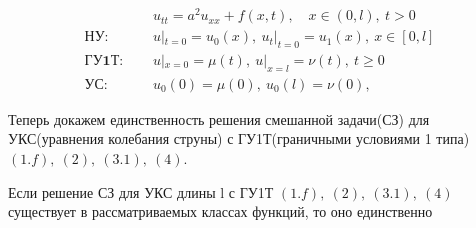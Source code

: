 \begin{align*}
	                      & u_{tt} = a^2 u_{xx} + f(x, t), \quad x \in (0,l),\ t > 0 \tag{1.f} \\
	\textbf{НУ: } \quad   & u|_{t=0}=u_0(x),\ u_t|_{t=0}=u_1(x),\ x \in [0,l] \tag{2}          \\
	\textbf{ГУ1Т: } \quad & u|_{x=0}=\mu(t),\ u|_{x=l}=\nu(t),\ t \ge 0 \tag{3.1}              \\
	\textbf{УС: } \quad   & u_0(0)=\mu(0),\ u_0(l)=\nu(0), \tag{4}
\end{align*}

Теперь докажем единственность решения смешанной задачи(СЗ) для УКС(уравнения колебания струны) с ГУ1Т(граничными условиями 1 типа) $(1.f),\ (2),\ (3.1),\ (4)$.

\begin{theorem}
	Если решение СЗ для УКС длины l с ГУ1Т $(1.f),\ (2),\ (3.1),\ (4)$ существует в рассматриваемых классах функций, то оно единственно
\end{theorem}

